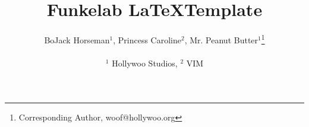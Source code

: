 \documentclass[twocolumn]{article}
\begin{document}
\title{Funkelab \LaTeX Template}

\author{
  BoJack Horseman$^{1}$,
  Princess Caroline$^{2}$,
  Mr. Peanut Butter$^{1}$\thanks{Corresponding Author, woof@hollywoo.org}
  \\\\
  \normalsize{$^1$ Hollywoo Studios},
  \normalsize{$^2$ VIM}\\
}

\maketitle







{
  \small
  
  
}

\clearpage
\begin{appendices}

\end{appendices}
\end{document}
